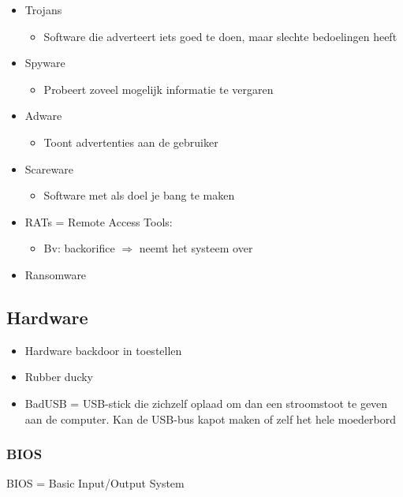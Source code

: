 \documentclass{article}
\begin{document}
\begin{itemize}
    \item Trojans
    \begin{itemize}
        \item Software die adverteert iets goed te doen, maar slechte bedoelingen heeft
    \end{itemize}
    \item Spyware
    \begin{itemize}
        \item Probeert zoveel mogelijk informatie te vergaren
    \end{itemize}
    \item Adware
    \begin{itemize}
        \item Toont advertenties aan de gebruiker
    \end{itemize}
    \item Scareware
    \begin{itemize}
        \item Software met als doel je bang te maken
    \end{itemize}
    \item RATs = Remote Access Tools:
    \begin{itemize}
        \item Bv: backorifice $\Rightarrow$ neemt het systeem over
    \end{itemize}
    \item Ransomware
\end{itemize}


\subsection{Hardware}
\begin{itemize}
    \item Hardware backdoor in toestellen
    \item Rubber ducky
    \item BadUSB = USB-stick die zichzelf oplaad om dan een stroomstoot te geven aan de computer. Kan de USB-bus kapot maken of zelf het hele moederbord
\end{itemize}


\subsubsection{BIOS}

BIOS = Basic Input/Output System 
\end{document}
